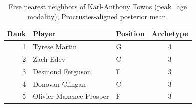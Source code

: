 \begin{table}[htbp]
  \centering\small
  \begin{tabular}{rllc}
    \toprule
    Rank & Player & Position & Archetype \\
    \midrule
    1 & Tyrese Martin & G & 4 \\
    2 & Zach Edey & C & 3 \\
    3 & Desmond Ferguson & F & 3 \\
    4 & Donovan Clingan & C & 3 \\
    5 & Olivier-Maxence Prosper & F & 3 \\
    \bottomrule
  \end{tabular}
  \caption{Five nearest neighbors of Karl-Anthony Towns (peak_age modality), Procrustes-aligned posterior mean.}
  \label{tab:Karl_Anthony_Towns_neighbors_peak_age}
\end{table}

